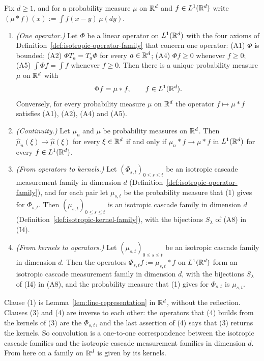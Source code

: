 \begin{lemma}\label{lem:operators-to-kernels}
Fix $d \ge 1$, and for a probability measure $\mu$ on $\mathbb{R}^d$ and $f \in L^1(\mathbb{R}^d)$ write
$(\mu * f)(x) := \int f(x - y)\,\mu(dy)$.
\begin{enumerate}
\item \emph{(One operator.)} Let $\Phi$ be a linear operator on $L^1(\mathbb{R}^d)$ with the four axioms
of Definition~\ref{def:isotropic-operator-family} that concern one operator: (A1) $\Phi$ is
bounded; (A2) $\Phi T_a = T_a\Phi$ for every $a \in \mathbb{R}^d$; (A4) $\Phi f \ge 0$ whenever
$f \ge 0$; (A5) $\int\Phi f = \int f$ whenever $f \ge 0$. Then there is a unique probability
measure $\mu$ on $\mathbb{R}^d$ with
\[
  \Phi f = \mu * f, \qquad f \in L^1(\mathbb{R}^d) .
\]
Conversely, for every probability measure $\mu$ on $\mathbb{R}^d$ the operator $f \mapsto \mu * f$
satisfies (A1), (A2), (A4) and (A5).
\item \emph{(Continuity.)} Let $\mu_n$ and $\mu$ be probability measures on $\mathbb{R}^d$. Then
$\widehat\mu_n(\xi) \to \widehat\mu(\xi)$ for every $\xi \in \mathbb{R}^d$ if and only if
$\mu_n * f \to \mu * f$ in $L^1(\mathbb{R}^d)$ for every $f \in L^1(\mathbb{R}^d)$.
\item \emph{(From operators to kernels.)} Let $(\Phi_{s,t})_{0 \le s \le t}$ be an isotropic
cascade measurement family in dimension $d$ (Definition~\ref{def:isotropic-operator-family}), and
for each pair let $\mu_{s,t}$ be the probability measure that (1) gives for $\Phi_{s,t}$. Then
$(\mu_{s,t})_{0 \le s \le t}$ is an isotropic cascade family in dimension $d$
(Definition~\ref{def:isotropic-kernel-family}), with the bijections $S_\lambda$ of (A8) in (I4).
\item \emph{(From kernels to operators.)} Let $(\mu_{s,t})_{0 \le s \le t}$ be an isotropic cascade
family in dimension $d$. Then the operators $\Phi_{s,t}f := \mu_{s,t} * f$ on $L^1(\mathbb{R}^d)$ form an
isotropic cascade measurement family in dimension $d$, with the bijections $S_\lambda$ of (I4) in
(A8), and the probability measure that (1) gives for $\Phi_{s,t}$ is $\mu_{s,t}$.
\end{enumerate}
\end{lemma}

Clause (1) is Lemma~\ref{lem:line-representation} in $\mathbb{R}^d$, without the reflection. Clauses (3)
and (4) are inverse to each other: the operators that (4) builds from the kernels of (3) are the
$\Phi_{s,t}$, and the last assertion of (4) says that (3) returns the kernels. So convolution is a
one-to-one correspondence between the isotropic cascade families and the isotropic cascade
measurement families in dimension $d$. From here on a family on $\mathbb{R}^d$ is given by its kernels.

